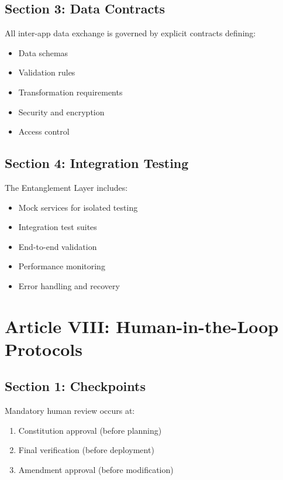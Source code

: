 \documentclass[12pt,letterpaper]{article}
\begin{document}
\subsection{Section 3: Data Contracts}

All inter-app data exchange is governed by explicit contracts defining:

\begin{itemize}
    \item Data schemas
    \item Validation rules
    \item Transformation requirements
    \item Security and encryption
    \item Access control
\end{itemize}

\subsection{Section 4: Integration Testing}

The Entanglement Layer includes:

\begin{itemize}
    \item Mock services for isolated testing
    \item Integration test suites
    \item End-to-end validation
    \item Performance monitoring
    \item Error handling and recovery
\end{itemize}

\section{Article VIII: Human-in-the-Loop Protocols}

\subsection{Section 1: Checkpoints}

Mandatory human review occurs at:

\begin{enumerate}
    \item Constitution approval (before planning)
    \item Final verification (before deployment)
    \item Amendment approval (before modification)
\end{enumerate}
\end{document}

